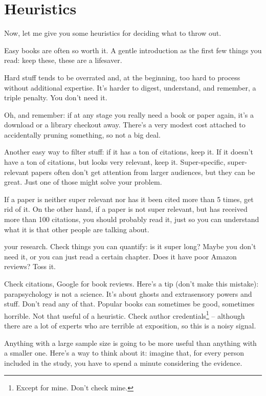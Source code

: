\section{Heuristics}

Now, let me give you some heuristics for deciding what to throw out.

Easy books are often so worth it. A gentle introduction as the first few things
you read: keep these, these are a lifesaver.

Hard stuff tends to be overrated and, at the beginning, too hard to process
without additional expertise. It's harder to digest, understand, and
remember, a triple penalty. You don't need it.

Oh, and remember: if at any stage you really need a book or paper again, it's a
download or a library checkout away. There's a very modest cost attached to
accidentally pruning something, so not a big deal.

Another easy way to filter stuff: if it has a ton of citations, keep it. If it
doesn't have a ton of citations, but looks very relevant, keep
it. Super-specific, super-relevant papers often don't get attention from
larger audiences, but they can be great. Just one of those might solve
your problem.

If a paper is neither super relevant nor has it been cited more than 5 times, get rid
of it. On the other hand, if a paper is not super relevant, but has received
more than 100 citations, you should probably read it, just so you can understand
what it is that other people are talking about. 

 your research. Check things you can quantify: is it
super long? Maybe you don't need it, or you can just read a certain
chapter. Does it have poor Amazon reviews? Toss it.

Check citations, Google for book reviews. Here's a tip (don't make this mistake):
parapsychology is not a science. It's about ghosts and extrasensory powers
and stuff. Don't read any of that.
Popular books can sometimes be good, sometimes horrible. Not that useful of a heuristic. Check author credentials\footnote{Except for mine. Don't check mine.} -- although there are a lot of experts who
are terrible at exposition, so this is a noisy signal. 

 Anything with a large sample size is going to be more useful
than anything with a smaller one. Here's a way to think about it: imagine that,
for every person included in the study, you have to spend a minute considering the evidence.

